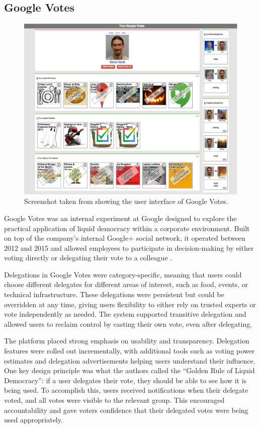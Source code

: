 \subsection{Google Votes}
\begin{figure}[H]
  \centering
  \includegraphics[width=0.8\linewidth]{../common/google_votes.png}
  \caption{Screenshot taken from \cite{hardt_google_2015} showing the user interface of Google Votes.}
\end{figure}

Google Votes was an internal experiment at Google designed to explore the practical application of liquid democracy within a corporate environment. Built on top of the company's internal Google+ social network, it operated between 2012 and 2015 and allowed employees to participate in decision-making by either voting directly or delegating their vote to a colleague \citep{hardt_google_2015}.

Delegations in Google Votes were category-specific, meaning that users could choose different delegates for different areas of interest, such as food, events, or technical infrastructure. These delegations were persistent but could be overridden at any time, giving users flexibility to either rely on trusted experts or vote independently as needed. The system supported transitive delegation and allowed users to reclaim control by casting their own vote, even after delegating.

The platform placed strong emphasis on usability and transparency. Delegation features were rolled out incrementally, with additional tools such as voting power estimates and delegation advertisements helping users understand their influence. One key design principle was what the authors called the ``Golden Rule of Liquid Democracy'': if a user delegates their vote, they should be able to see how it is being used. To accomplish this, users received notifications when their delegate voted, and all votes were visible to the relevant group. This encouraged accountability and gave voters confidence that their delegated votes were being used appropriately.

